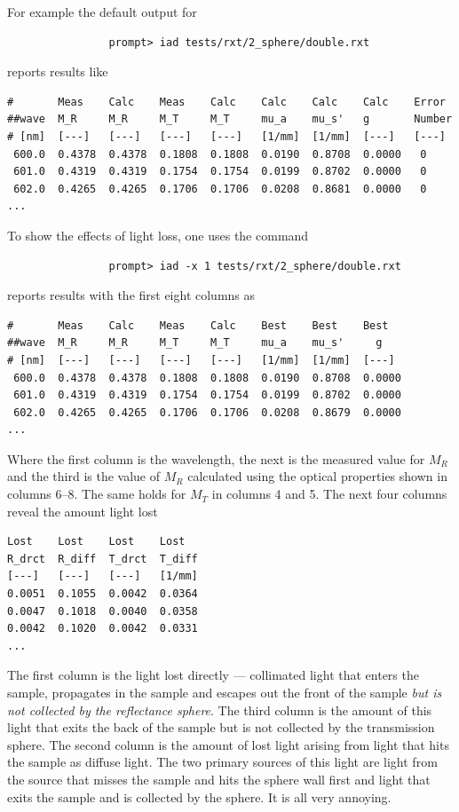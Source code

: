\documentclass{article}
\begin{document}
For example the default output for
\begin{verbatim}
                prompt> iad tests/rxt/2_sphere/double.rxt
\end{verbatim}
reports results like
\begin{verbatim}
#       Meas    Calc    Meas    Calc    Calc    Calc    Calc    Error
##wave  M_R     M_R     M_T     M_T     mu_a    mu_s'   g       Number
# [nm]  [---]   [---]   [---]   [---]   [1/mm]  [1/mm]  [---]   [---]
 600.0  0.4378  0.4378  0.1808  0.1808  0.0190  0.8708  0.0000   0
 601.0  0.4319  0.4319  0.1754  0.1754  0.0199  0.8702  0.0000   0
 602.0  0.4265  0.4265  0.1706  0.1706  0.0208  0.8681  0.0000   0
...
\end{verbatim}
To show the effects of light loss, one uses the command
\begin{verbatim}
                prompt> iad -x 1 tests/rxt/2_sphere/double.rxt
\end{verbatim}
reports results with the first eight columns as
\begin{verbatim}
#       Meas    Calc    Meas    Calc    Best    Best    Best   
##wave  M_R     M_R     M_T     M_T     mu_a    mu_s'     g    
# [nm]  [---]   [---]   [---]   [---]   [1/mm]  [1/mm]  [---]  
 600.0  0.4378  0.4378  0.1808  0.1808  0.0190  0.8708  0.0000 
 601.0  0.4319  0.4319  0.1754  0.1754  0.0199  0.8702  0.0000 
 602.0  0.4265  0.4265  0.1706  0.1706  0.0208  0.8679  0.0000 
...
\end{verbatim}
Where the first column is the wavelength, the next is the measured
value for $M_R$ and the third is the value of $M_R$ calculated using
the optical properties shown in columns 6--8.  The same holds for
$M_T$ in columns 4 and 5.  The next four columns reveal the amount
light lost
\begin{verbatim}
Lost    Lost    Lost    Lost    
R_drct  R_diff  T_drct  T_diff  
[---]   [---]   [---]   [1/mm] 
0.0051  0.1055  0.0042  0.0364  
0.0047  0.1018  0.0040  0.0358  
0.0042  0.1020  0.0042  0.0331  
...
\end{verbatim}
The first column is the light lost directly --- collimated light that enters
the sample, propagates in the sample and escapes out the front of the sample
\textit{but is not collected by the reflectance sphere}.  The third column is
the amount of this light that exits the back of the sample but is not collected
by the transmission sphere.  The second column is the amount of lost light arising
from light that hits the sample as diffuse light.  The two primary sources of this
light are light from the source that misses the sample and hits the sphere wall 
first and light that exits the sample and is collected by the sphere.  It is all
very annoying.
\end{document}
